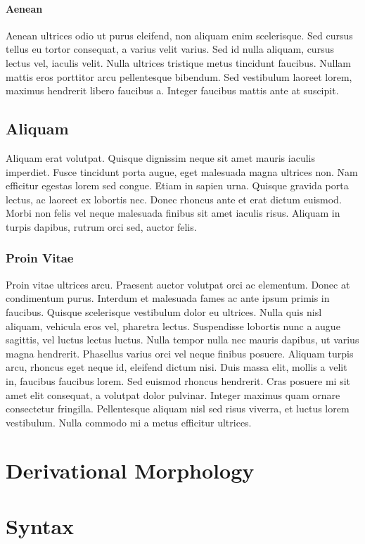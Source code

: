 \documentclass{clgrammar}
\begin{document}
\subsubsection{Aenean}
Aenean ultrices odio ut purus eleifend, non aliquam enim scelerisque. Sed cursus tellus eu tortor consequat, a varius velit varius. Sed id nulla aliquam, cursus lectus vel, iaculis velit. Nulla ultrices tristique metus tincidunt faucibus. Nullam mattis eros porttitor arcu pellentesque bibendum. Sed vestibulum laoreet lorem, maximus hendrerit libero faucibus a. Integer faucibus mattis ante at suscipit.

\section{Aliquam}
Aliquam erat volutpat. Quisque dignissim neque sit amet mauris iaculis imperdiet. Fusce tincidunt porta augue, eget malesuada magna ultrices non. Nam efficitur egestas lorem sed congue. Etiam in sapien urna. Quisque gravida porta lectus, ac laoreet ex lobortis nec. Donec rhoncus ante et erat dictum euismod. Morbi non felis vel neque malesuada finibus sit amet iaculis risus. Aliquam in turpis dapibus, rutrum orci sed, auctor felis.

\subsection{Proin Vitae}
Proin vitae ultrices arcu. Praesent auctor volutpat orci ac elementum. Donec at condimentum purus. Interdum et malesuada fames ac ante ipsum primis in faucibus. Quisque scelerisque vestibulum dolor eu ultrices. Nulla quis nisl aliquam, vehicula eros vel, pharetra lectus. Suspendisse lobortis nunc a augue sagittis, vel luctus lectus luctus. Nulla tempor nulla nec mauris dapibus, ut varius magna hendrerit. Phasellus varius orci vel neque finibus posuere. Aliquam turpis arcu, rhoncus eget neque id, eleifend dictum nisi. Duis massa elit, mollis a velit in, faucibus faucibus lorem. Sed euismod rhoncus hendrerit. Cras posuere mi sit amet elit consequat, a volutpat dolor pulvinar. Integer maximus quam ornare consectetur fringilla. Pellentesque aliquam nisl sed risus viverra, et luctus lorem vestibulum. Nulla commodo mi a metus efficitur ultrices. 

\chapter{Derivational Morphology}

\chapter{Syntax}
\end{document}
